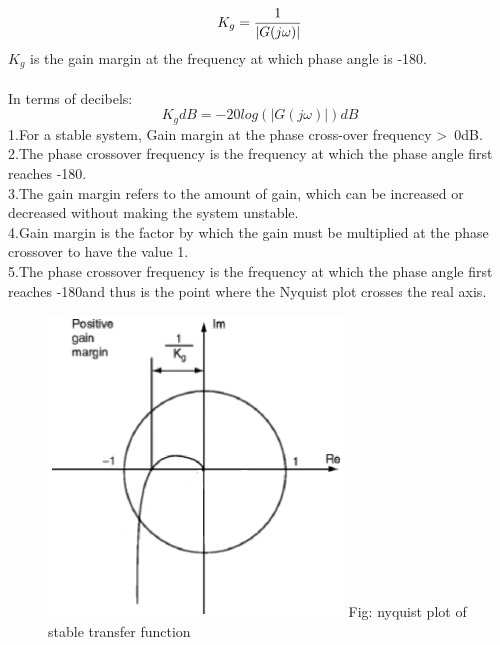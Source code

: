 \begin{enumerate}[label=\thesection.\arabic*.,ref=\thesection.\theenumi]
\begin{equation}
   \\ K_g = \frac{1}{|G(j\omega)|}
\end{equation} 
$K_g$ is the gain margin
at the frequency at which phase angle
is -180\degree.
\\\\ 
In terms of decibels: 
\begin{equation}
    K_g dB = -20log(|G(j\omega)|) dB
\end{equation}
1.For a stable system, Gain margin at the phase cross-over frequency \textgreater \ 0dB. \\
2.The phase crossover frequency is the frequency at which the phase angle first reaches -180\degree. \\
3.The gain margin refers to the amount of gain, which can be increased or decreased without making the system unstable. \\
4.Gain margin is the factor by which the gain must be multiplied at the phase crossover to have the value 1. \\
5.The phase crossover frequency is the frequency at which the phase angle first reaches -180\degree and thus is the point where the Nyquist plot crosses the real axis. \\
\begin{figure}[h]
    \centering
    \includegraphics[width=1.02\linewidth, height=8cm]{./figs/1.eps}
    Fig: nyquist plot of stable transfer function
\end{figure}


\end{enumerate}
